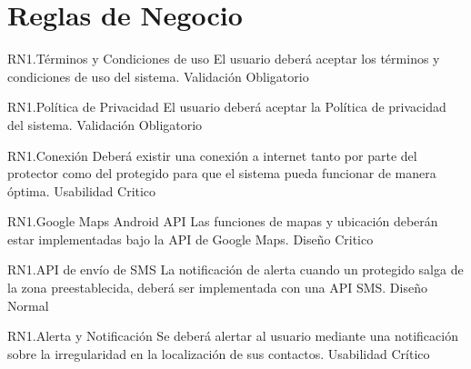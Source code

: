 \section{Reglas de Negocio}
\begin{BussinesRule}{RN1.}{Términos y Condiciones de uso}
	\BRitem[Descripción:] El usuario deberá aceptar los términos y condiciones de uso del sistema.
	\BRitem[Tipo:] Validación
	\BRitem[Nivel:] Obligatorio
\end{BussinesRule}


\begin{BussinesRule}{RN1.}{Política de Privacidad}
	\BRitem[Descripción:] El usuario deberá aceptar la Política de privacidad del sistema.
	\BRitem[Tipo:] Validación
	\BRitem[Nivel:] Obligatorio
\end{BussinesRule}


\begin{BussinesRule}{RN1.}{Conexión}
	\BRitem[Descripción:] Deberá existir una conexión a internet tanto por parte del protector como del protegido para que el sistema pueda funcionar de manera óptima.
	\BRitem[Tipo:] Usabilidad
	\BRitem[Nivel:] Critico
\end{BussinesRule}


\begin{BussinesRule}{RN1.}{Google Maps Android API}
	\BRitem[Descripción:] Las funciones de mapas y ubicación deberán estar implementadas bajo la API de Google Maps.
	\BRitem[Tipo:] Diseño
	\BRitem[Nivel:] Critico
\end{BussinesRule}


\begin{BussinesRule}{RN1.}{API de envío de SMS}
	\BRitem[Descripción:] La notificación de alerta cuando un protegido salga de la zona preestablecida, deberá ser  implementada con una API SMS.
	\BRitem[Tipo:] Diseño
	\BRitem[Nivel:] Normal
\end{BussinesRule}




\begin{BussinesRule}{RN1.}{Alerta y Notificación}
	\BRitem[Descripción:] Se deberá alertar al usuario mediante una notificación sobre la irregularidad en la localización de sus contactos.
	\BRitem[Tipo:] Usabilidad
	\BRitem[Nivel:] Crítico
\end{BussinesRule}

